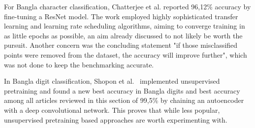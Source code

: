 \documentclass[english,twoside,openright]{UH_DS_MSc}
\begin{document}
For Bangla character classification, Chatterjee et al. reported 96,12\% accuracy 
by fine-tuning a ResNet model. The work employed highly sophisticated transfer
 learning and learning rate scheduling algorithms, aiming to converge training in as 
 little epochs as possible, an aim already discussed to not likely be worth the pursuit.
  Another concern was the concluding statement "if those misclassified points were 
  removed from the dataset, the accuracy will improve further", which was not done 
  to keep the benchmarking accurate.



In Bangla digit classification, Shopon et al.~\cite{6shoponBangla} implemented unsupervised 
pretraining and found a new best accuracy in Bangla digits
and best accuracy among all articles reviewed in this section of 99,5\% by chaining an autoencoder
with a deep convolutional network. This proves that while less popular, unsupervised pretraining
based approaches are worth experimenting with.



\end{document}
